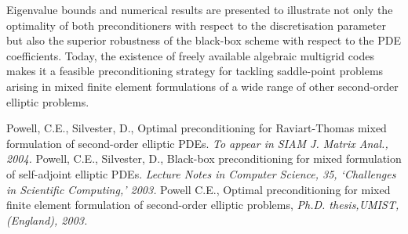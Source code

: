 \documentclass{report}
\begin{document}
Eigenvalue bounds and numerical results are presented to illustrate not
only the optimality of both preconditioners with respect to the
discretisation parameter but also the superior robustness of the
black-box scheme with respect to the PDE coefficients. Today, the
existence of freely available algebraic multigrid codes makes it a
feasible preconditioning strategy for tackling saddle-point problems
arising in mixed finite element formulations of a wide range of other
second-order elliptic problems.

\begin{thebibliography}{10}
 Powell, C.E., Silvester, D., Optimal preconditioning for
Raviart-Thomas mixed formulation of second-order elliptic PDEs.
\textit{To appear in SIAM J. Matrix Anal., 2004.}
Powell, C.E., Silvester, D., Black-box preconditioning for
mixed formulation of self-adjoint elliptic PDEs. \textit{Lecture Notes in
Computer Science, 35, `Challenges in Scientific Computing,' 2003.}
Powell C.E., Optimal preconditioning for mixed finite element
formulation of second-order elliptic problems, \textit{Ph.D.
thesis,UMIST, (England), 2003.}
\end{thebibliography}
\end{document}

